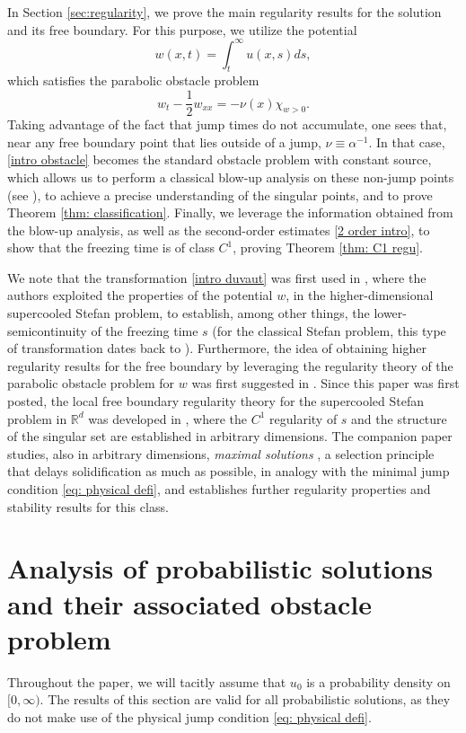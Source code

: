 \documentclass{article}
\numberwithin{equation}{section}
\numberwithin{figure}{section}
\theoremstyle{plain}
\theoremstyle{plain}
\theoremstyle{plain}
\theoremstyle{plain}
\theoremstyle{definition}
\theoremstyle{remark}
\def\R{{\mathbb{R}}}
\begin{document}
In Section \ref{sec:regularity}, we prove the main regularity results for the solution and its free boundary. For this purpose, we utilize the potential
\begin{equation} \label{intro duvaut}
    w(x,t)=\int_{t}^{\infty}u(x,s)ds,
\end{equation}
which satisfies the parabolic obstacle problem
\begin{equation} \label{intro obstacle} w_t-\frac{1}{2}w_{xx}=-\nu(x)\chi_{w>0}.    
\end{equation}
Taking advantage of the fact that jump times do not accumulate, one sees that, near any free boundary point that lies outside of a jump, $\nu\equiv \alpha^{-1}$. In that case, \eqref{intro obstacle} becomes the standard obstacle problem with constant source, which allows us to perform a classical blow-up analysis on these non-jump points (see \cite{CafObstacle,CafPetSha}), to achieve a precise understanding of the singular points, and to prove Theorem \ref{thm: classification}. Finally, we leverage the information obtained from the blow-up analysis, as well as the second-order estimates \eqref{2 order intro}, to show that the freezing time is of class $C^1$, proving Theorem \ref{thm: C1 regu}.
 
We note that the transformation \eqref{intro duvaut} was first used in \cite{KK}, where the authors exploited the properties of the potential $w$, in the higher-dimensional supercooled Stefan problem, to establish, among other things, the lower-semicontinuity of the freezing time $s$ (for the classical Stefan problem, this type of transformation dates back to \cite{duvaut}). Furthermore, the idea of obtaining higher regularity results for the free boundary by leveraging the regularity theory of the parabolic obstacle problem for $w$ was first suggested in \cite[Sec. 4.3]{KK}. Since this paper was first posted, the local free boundary regularity theory for the supercooled Stefan problem in $\R^d$ was developed in \cite{EKM}, where the $C^1$ regularity of $s$ and the structure of the singular set are established in arbitrary dimensions. The companion paper \cite{CKM} studies, also in arbitrary dimensions, \emph{maximal solutions} \cite{CKK,KK}, a selection principle that delays solidification as much as possible, in analogy with the minimal jump condition \eqref{eq: physical defi}, and establishes further regularity properties and stability results for this class.
\section{Analysis of probabilistic solutions and their associated obstacle problem} \label{sec:estimates}
Throughout the paper, we will tacitly assume that $u_0$ is a probability density on $[0,\infty)$. The results of this section are valid for all probabilistic solutions, as they do not make use of the physical jump condition \eqref{eq: physical defi}.
\end{document}
